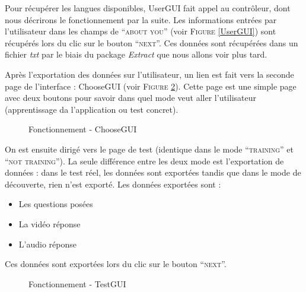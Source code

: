 Pour récupérer les langues disponibles, UserGUI fait appel au contrôleur, dont nous décrirons le fonctionnement par la suite.
Les informations entrées par l'utilisateur dans les champs de ``\textsc{about you}'' (voir \textsc{Figure} \ref{UserGUI}) sont récupérés lors du clic sur le bouton ``\textsc{next}''. Ces données sont récupérées dans un fichier \textit{txt} par le biais du package \textit{Extract} que nous allons voir plus tard.

Après l'exportation des données sur l'utilisateur, un lien est fait vers la seconde page de l'interface : ChooseGUI (voir \textsc{Figure} \ref{ChooseGUI}). Cette page est une simple page avec deux boutons pour savoir dans quel mode veut aller l'utilisateur (apprentissage da l'application ou test concret).

\newpage

\begin{figure}[!ht]
\begin{center}
  \caption{Fonctionnement - ChooseGUI}
  \label{ChooseGUI} 
\end{center}
\end{figure}

On est ensuite dirigé vers le page de test (identique dans le mode ``\textsc{training}'' et ``\textsc{not training}''). La seule différence entre les deux mode est l'exportation de données : dans le test réel, les données sont exportées tandis que dans le mode de découverte, rien n'est exporté.
Les données exportées sont :
\begin{itemize}
 \item Les questions posées
 \item La vidéo réponse
 \item L'audio réponse
\end{itemize}
Ces données sont exportées lors du clic sur le bouton ``\textsc{next}''.

\begin{figure}[!ht]
\begin{center}
  \caption{Fonctionnement - TestGUI}
  \label{ChooseGUI} 
\end{center}
\end{figure}

